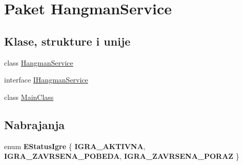 \hypertarget{namespaceHangmanService}{}\section{Paket Hangman\+Service}
\label{namespaceHangmanService}
\subsection*{Klase, strukture i unije}
\begin{DoxyCompactItemize}
\item 
class \hyperlink{classHangmanService_1_1HangmanService}{Hangman\+Service}
\item 
interface \hyperlink{interfaceHangmanService_1_1IHangmanService}{I\+Hangman\+Service}
\item 
class \hyperlink{classHangmanService_1_1MainClass}{Main\+Class}
\end{DoxyCompactItemize}
\subsection*{Nabrajanja}
\begin{DoxyCompactItemize}
\item 
\hypertarget{namespaceHangmanService_a52c71cb6cb4ff0ced6c64a456401a7ae}{}enum {\bfseries E\+Status\+Igre} \{ {\bfseries I\+G\+R\+A\+\_\+\+A\+K\+T\+I\+V\+N\+A}, 
{\bfseries I\+G\+R\+A\+\_\+\+Z\+A\+V\+R\+S\+E\+N\+A\+\_\+\+P\+O\+B\+E\+D\+A}, 
{\bfseries I\+G\+R\+A\+\_\+\+Z\+A\+V\+R\+S\+E\+N\+A\+\_\+\+P\+O\+R\+A\+Z}
 \}\label{namespaceHangmanService_a52c71cb6cb4ff0ced6c64a456401a7ae}

\end{DoxyCompactItemize}
